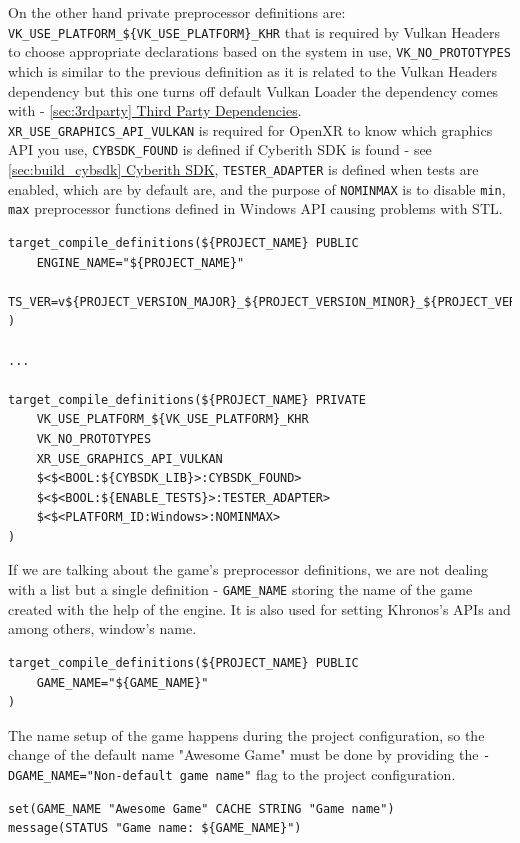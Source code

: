 On the other hand private preprocessor definitions are: \texttt{VK\_USE\_PLATFORM\_\$\{VK\_USE\_PLATFORM\}\_KHR} that is required by Vulkan Headers to choose appropriate declarations based on the system in use, \texttt{VK\_NO\_PROTOTYPES} which is similar to the previous definition as it is related to the Vulkan Headers dependency but this one turns off default Vulkan Loader the dependency comes with - \hyperref[sec:3rdparty]{\ref*{sec:3rdparty} Third Party Dependencies}.\\
\texttt{XR\_USE\_GRAPHICS\_API\_VULKAN} is required for OpenXR to know which graphics API you use, \texttt{CYBSDK\_FOUND} is defined if Cyberith SDK is found - see \hyperref[sec:build_cybsdk]{\ref*{sec:build_cybsdk} Cyberith SDK}, \texttt{TESTER\_ADAPTER} is defined when tests are enabled, which are by default are, and the purpose of \texttt{NOMINMAX} is to disable \texttt{min}, \texttt{max} preprocessor functions defined in Windows API causing problems with STL.
\begin{lstlisting}[caption=Engine's preprocessor definitions (./engine/CMakeLists.txt)]
target_compile_definitions(${PROJECT_NAME} PUBLIC
    ENGINE_NAME="${PROJECT_NAME}"
    TS_VER=v${PROJECT_VERSION_MAJOR}_${PROJECT_VERSION_MINOR}_${PROJECT_VERSION_PATCH}
)

...

target_compile_definitions(${PROJECT_NAME} PRIVATE
    VK_USE_PLATFORM_${VK_USE_PLATFORM}_KHR
    VK_NO_PROTOTYPES
    XR_USE_GRAPHICS_API_VULKAN
    $<$<BOOL:${CYBSDK_LIB}>:CYBSDK_FOUND>
    $<$<BOOL:${ENABLE_TESTS}>:TESTER_ADAPTER>
    $<$<PLATFORM_ID:Windows>:NOMINMAX>
)
\end{lstlisting}

If we are talking about the game's preprocessor definitions, we are not dealing with a list but a single definition - \texttt{GAME\_NAME} storing the name of the game created with the help of the engine. It is also used for setting Khronos's APIs and among others, window's name.
\begin{lstlisting}[caption=Game's preprocessor definitions (./game/CMakeLists.txt)]
target_compile_definitions(${PROJECT_NAME} PUBLIC
    GAME_NAME="${GAME_NAME}"
)
\end{lstlisting}

\label{game_name}
The name setup of the game happens during the project configuration, so the change of the default name "Awesome Game" must be done by providing the \texttt{-DGAME\_NAME="Non-default game name"} flag to the project configuration.
\begin{lstlisting}[caption=Game's preprocessor definitions (./CMakeLists.txt)]
set(GAME_NAME "Awesome Game" CACHE STRING "Game name")
message(STATUS "Game name: ${GAME_NAME}")
\end{lstlisting}

